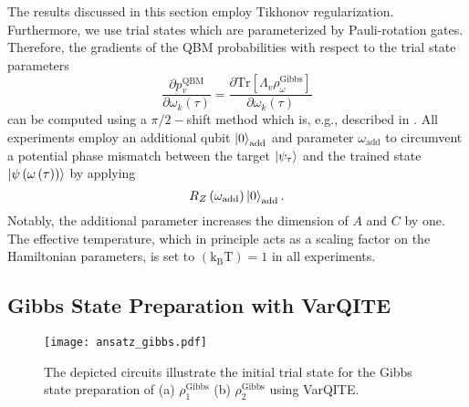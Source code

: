 \documentclass[twocolumn, aps, pra, superscriptaddress, floatfix]{revtex4}
\begin{document}
The results discussed in this section employ Tikhonov regularization.
Furthermore, we use trial states which are parameterized by Pauli-rotation gates. Therefore, the gradients of the QBM probabilities with respect to the trial state parameters
\begin{equation*}
   \frac{ \partial  p_v^{\text{QBM}}}{\partial\omega_k\left(\tau\right)}=\frac{\partial \text{Tr}\left[\Lambda_v\rho_{\omega}^{\text{Gibbs}}\right]} {\partial\omega_k\left(\tau\right)}
\end{equation*}
can be computed using a $\pi/2-$shift method which is, e.g., described in \cite{Zoufal2019}.
All experiments employ an additional qubit $\ket{0}_{\text{add}}$ and parameter $\omega_{\text{add}}$ to circumvent a potential phase mismatch between the target $\ket{\psi_{\tau}}$ and the trained state $\ket{ \psi\left(\omega\left(\tau\right)\right)}$ \cite{VarSITEMcArdle19, Simon18TheoryVarQSim, QNGNonUnitary19Simon} by applying
\begin{equation*}
   R_Z\left(\omega_{\text{add}}\right)\ket{0}_{\text{add}}.  
\end{equation*}
Notably, the additional parameter increases the dimension of $A$ and $C$ by one.
The effective temperature, which in principle acts as a scaling factor on the Hamiltonian parameters, is set to $\left(\text{k}_{\text{B}}\text{T}\right) = 1$ in all experiments. 

\subsection{Gibbs State Preparation with VarQITE}
\label{sec:VarQITEResults}
\begin{figure}[h!]
\captionsetup{singlelinecheck = false, format= hang, justification=raggedright, font=footnotesize, labelsep=space}
\begin{center}
\texttt{[image: ansatz\_gibbs.pdf]}
\end{center}
\caption{The depicted circuits illustrate the initial trial state for the Gibbs state preparation of (a) $\rho^{\text{Gibbs}}_1 $ (b) $\rho^{\text{Gibbs}}_2$ using VarQITE.
}
\label{fig:ansaetze}
\end{figure}
\end{document}
